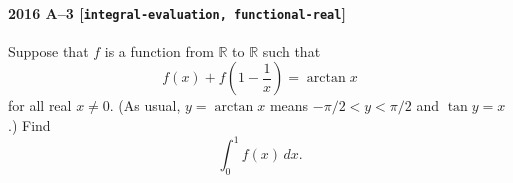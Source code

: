 \paragraph{2016 A--3 \textnormal{[\texttt{integral-evaluation, functional-real}]}}
Suppose that $f$ is a function from $\mathbb{R}$ to $\mathbb{R}$ such that
\[
f(x) + f\left( 1 - \frac{1}{x} \right) = \arctan x
\]
for all real $x \neq 0$. (As usual, $y = \arctan x$ means $-\pi/2 < y < \pi/2$ and $\tan y = x$.) Find
\[
\int_0^1 f(x)\,dx.
\]
